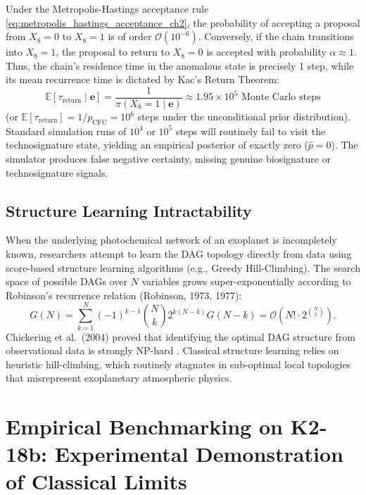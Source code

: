 Under the Metropolis-Hastings acceptance rule \eqref{eq:metropolis_hastings_acceptance_ch2}, the probability of accepting a proposal from $X_8 = 0$ to $X_8 = 1$ is of order $\mathcal{O}(10^{-6})$. Conversely, if the chain transitions into $X_8 = 1$, the proposal to return to $X_8 = 0$ is accepted with probability $\alpha \approx 1$. Thus, the chain's residence time in the anomalous state is precisely 1 step, while its mean recurrence time is dictated by Kac's Return Theorem:
\begin{equation}
\mathbb{E}[\tau_{\mathrm{return}} \mid \mathbf{e}] = \frac{1}{\pi(X_8 = 1 \mid \mathbf{e})} \approx 1.95 \times 10^5 \text{ Monte Carlo steps}
\label{eq:kac_return_theorem}
\end{equation}
(or $\mathbb{E}[\tau_{\mathrm{return}}] = 1/p_{\mathrm{CFC}} = 10^6$ steps under the unconditional prior distribution). Standard simulation runs of $10^4$ or $10^5$ steps will routinely fail to visit the technosignature state, yielding an empirical posterior of exactly zero ($\hat{p} = 0$). The simulator produces false negative certainty, missing genuine biosignature or technosignature signals.

\subsection{Structure Learning Intractability}
When the underlying photochemical network of an exoplanet is incompletely known, researchers attempt to learn the DAG topology directly from data using score-based structure learning algorithms (e.g., Greedy Hill-Climbing). The search space of possible DAGs over $N$ variables grows super-exponentially according to Robinson's recurrence relation (Robinson, 1973, 1977):
\begin{equation}
G(N) = \sum_{k=1}^N (-1)^{k-1} \binom{N}{k} 2^{k(N-k)} G(N-k) = \mathcal{O}\left(N! \cdot 2^{\binom{N}{2}}\right).
\label{eq:dag_search_space_explosion}
\end{equation}
Chickering et al.~(2004) proved that identifying the optimal DAG structure from observational data is strongly NP-hard \cite{chickering2004}. Classical structure learning relies on heuristic hill-climbing, which routinely stagnates in sub-optimal local topologies that misrepresent exoplanetary atmospheric physics.

\section{Empirical Benchmarking on K2-18b: Experimental Demonstration of Classical Limits}\label{sec:empirical_classical_benchmark}

